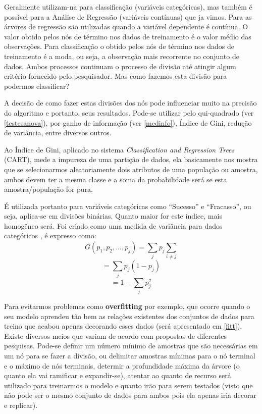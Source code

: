 \documentclass[
  openany]{book}
\begin{document}
Geralmente utilizam-na para classificação (variáveis categóricas), mas também é possível para a Análise de Regressão (variáveis contínuas) que ja vimos. Para as árvores de regressão são utilizadas quando a variável dependente é contínua. O valor obtido pelos nós de término nos dados de treinamento é o valor médio das observações. Para classificação o obtido pelos nós de término nos dados de treinamento é a moda, ou seja, a observação mais recorrente no conjunto de dados. Ambos processos continuam o processo de divisão até atingir algum critério fornecido pelo pesquisador. Mas como fazemos esta divisão para podermos classificar?

A decisão de como fazer estas divisões dos nós pode influenciar muito na precisão do algoritmo e portanto, seus resultados. Pode-se utilizar pelo qui-quadrado (ver \ref{testesanova}), por ganho de informação (ver \ref{medinfo}), Índice de Gini, redução de variância, entre diversos outros.

Ao Índice de Gini, aplicado no sistema \emph{Classification and Regression Trees} (CART)\citep{breiman1984classification}, mede a impureza de uma partição de dados, ela basicamente nos mostra que se selecionarmos aleatoriamente dois atributos de uma população ou amostra, ambos devem ter a mesma classe e a soma da probabilidade será se esta amostra/população for pura.

É utilizada portanto para variáveis categóricas como ``Sucesso'' e ``Fracasso'', ou seja, aplica-se em divisões binárias. Quanto maior for este índice, mais homogêneo será. Foi criado como uma medida de variância para dados categóricos \citep{light1971analysis}, é expresso como:
\[G(p_1,p_2,...,p_j)=\displaystyle \sum_{j}p_j  \sum_{i\neq j}\]
\[= \displaystyle \sum_j p_j(1-p_j) \]
\begin{equation}
= \displaystyle 1-\sum_j p^2_j
\label{eq:indgini1}
\end{equation}

Para evitarmos problemas como \textbf{overfitting} por exemplo, que ocorre quando o seu modelo aprendeu tão bem as relações existentes dos conjuntos de dados para treino que acabou apenas decorando esses dados (será apresentado em \ref{fitt}). Existe diversos meios que variam de acordo com propostas de diferentes pesquisas. Pode-se definir um número mínimo de amostras que são necessárias em um nó para se fazer a divisão, ou delimitar amostras mínimas para o nó terminal e o máximo de nós terminais, determir a profundidade máxima da árvore (o quanto ela vai ramificar e expandir-se), atentar ao quanto de recurso será utilizado para treinarmos o modelo e quanto irão para serem testados (visto que não pode ser o mesmo conjunto de dados para ambos pois ela apenas iria decorar e replicar).
\end{document}
